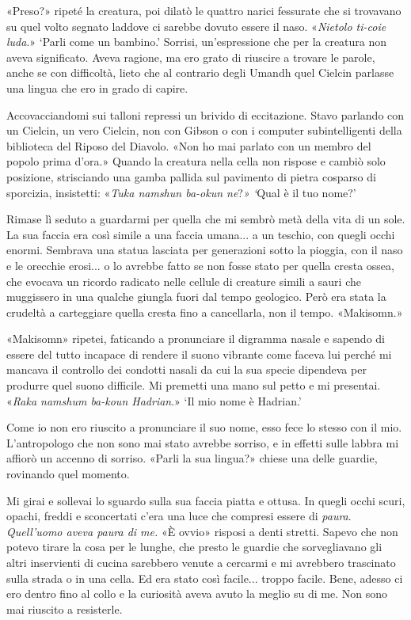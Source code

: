 «Preso?» ripeté la creatura, poi dilatò le quattro narici fessurate che
si trovavano su quel volto segnato laddove ci sarebbe dovuto essere il
naso. «\emph{Nietolo ti-coie luda}.» `Parli come un bambino.' Sorrisi,
un'espressione che per la creatura non aveva significato. Aveva ragione,
ma ero grato di riuscire a trovare le parole, anche se con difficoltà,
lieto che al contrario degli Umandh quel Cielcin parlasse una lingua che
ero in grado di capire.

Accovacciandomi sui talloni repressi un brivido di eccitazione. Stavo
parlando con un Cielcin, un vero Cielcin, non con Gibson o con i
computer subintelligenti della biblioteca del Riposo del Diavolo. «Non
ho mai parlato con un membro del popolo prima d'ora.» Quando la creatura
nella cella non rispose e cambiò solo posizione, strisciando una gamba
pallida sul pavimento di pietra cosparso di sporcizia, insistetti:
«\emph{Tuka namshun ba-okun ne}?\emph{» `}Qual è il tuo nome?'

Rimase lì seduto a guardarmi per quella che mi sembrò metà della vita di
un sole. La sua faccia era così simile a una faccia umana... a un
teschio, con quegli occhi enormi. Sembrava una statua lasciata per
generazioni sotto la pioggia, con il naso e le orecchie erosi... o lo
avrebbe fatto se non fosse stato per quella cresta ossea, che evocava un
ricordo radicato nelle cellule di creature simili a sauri che muggissero
in una qualche giungla fuori dal tempo geologico. Però era stata la
crudeltà a carteggiare quella cresta fino a cancellarla, non il tempo.
«Makisomn.»

«Makisomn» ripetei, faticando a pronunciare il digramma nasale e sapendo
di essere del tutto incapace di rendere il suono vibrante come faceva
lui perché mi mancava il controllo dei condotti nasali da cui la sua
specie dipendeva per produrre quel suono difficile. Mi premetti una mano
sul petto e mi presentai. «\emph{Raka namshum ba-koun Hadrian}.» `Il mio
nome è Hadrian.'

Come io non ero riuscito a pronunciare il suo nome, esso fece lo stesso
con il mio. L'antropologo che non sono mai stato avrebbe sorriso, e in
effetti sulle labbra mi affiorò un accenno di sorriso. «Parli la sua
lingua?» chiese una delle guardie, rovinando quel momento.

Mi girai e sollevai lo sguardo sulla sua faccia piatta e ottusa. In
quegli occhi scuri, opachi, freddi e sconcertati c'era una luce che
compresi essere di \emph{paura}. \emph{Quell'uomo aveva paura di me.} «È
ovvio» risposi a denti stretti. Sapevo che non potevo tirare la cosa per
le lunghe, che presto le guardie che sorvegliavano gli altri inservienti
di cucina sarebbero venute a cercarmi e mi avrebbero trascinato sulla
strada o in una cella. Ed era stato così facile... troppo facile. Bene,
adesso ci ero dentro fino al collo e la curiosità aveva avuto la meglio
su di me. Non sono mai riuscito a resisterle.

